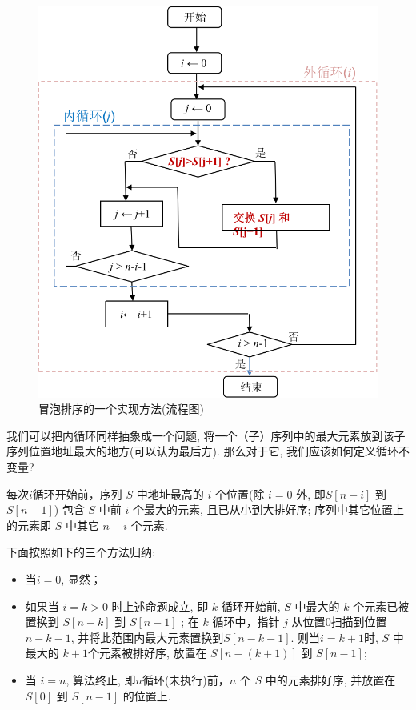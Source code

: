 \begin{figure}[!htbp]
	\centering
	\includegraphics[scale=0.5]{2-prop-logic/figs/bubble-sort}
	\caption{冒泡排序的一个实现方法(流程图)}
	\label{fig:bub-sor}
\end{figure}


我们可以把内循环同样抽象成一个问题, 将一个（子）序列中的最大元素放到该子序列位置地址最大的地方(可以认为最后方). 那么对于它, 我们应该如何定义循环不变量? 

每次$i$循环开始前，序列 $S$ 中地址最高的 $i$ 个位置(除 $i=0$ 外, 即$S[n-i]$ 到 $S[n-1]$) 包含 $S$ 中前 $i$ 个最大的元素, 且已从小到大排好序; 序列中其它位置上的元素即 $S$ 中其它 $n-i$ 个元素. 

下面按照如下的三个方法归纳: 

\begin{itemize}
	\item 当$i=0$, 显然；
	\item 如果当 $i=k>0$ 时上述命题成立, 即 $k$ 循环开始前,  $S$ 中最大的 $k$ 个元素已被置换到 $S[n-k]$ 到 $S[n-1]$ ; 在 $k$ 循环中，指针 $j$ 从位置$0$扫描到位置$n-k-1$, 并将此范围内最大元素置换到$S[n-k-1]$. 则当$i=k+1$时, $S$ 中最大的 $k+1$个元素被排好序, 放置在 $S[n-(k+1)]$ 到 $S[n-1]$;
	\item 当 $i=n$, 算法终止, 即$n$循环(未执行)前，$n$ 个 $S$ 中的元素排好序, 并放置在 $S[0]$ 到 $S[n-1]$ 的位置上. 
 
 

\end{itemize}

